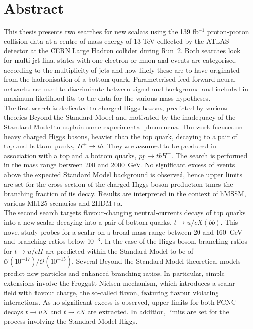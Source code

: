 \chapter*{Abstract}

This thesis presents two searches for new scalars using the 139 fb$^{-1}$ proton-proton collision data at a centre-of-mass energy of 13 TeV collected by the ATLAS detector at the CERN Large Hadron collider during Run~2. Both searches look for multi-jet final states with one electron or muon and events are categorised according to the multiplicity of jets and how likely these are to have originated from the hadronisation of a bottom quark. Parameterised feed-forward neural networks are used to discriminate between signal and background and included in maximum-likelihood fits to the data for the various mass hypotheses.\\

The first search is dedicated to charged Higgs bosons, predicted by various theories Beyond the Standard Model and motivated by the inadequacy of the Standard Model to explain some experimental phenomena. The work focuses on heavy charged Higgs bosons, heavier than the top quark, decaying to a pair of top and bottom quarks, $H^\pm\to tb$. They are assumed to be produced in association with a top and a bottom quarks, $pp\to tbH^\pm$. The search is performed in the mass range between 200 and 2000~GeV. No significant excess of events above the expected Standard Model background is observed, hence upper limits are set for the cross-section of the charged Higgs boson production times the branching fraction of its decay. Results are interpreted in the context of hMSSM, various Mh125 scenarios and 2HDM+a.\\

The second search targets flavour-changing neutral-currents decays of top quarks into a new scalar decaying into a pair of bottom quarks, $t \to u/c X(bb)$. This novel study probes for a scalar on a broad mass range between 20 and 160~GeV and branching ratios below 10$^{-3}$. In the case of the Higgs boson, branching ratios for $t \to u/c H$ are predicted within the Standard Model to be of $\mathcal{O}(10^{-17})/\mathcal{O}(10^{-15})$. Several Beyond the Standard Model theoretical models predict new particles and enhanced branching ratios. In particular, simple extensions involve the Froggatt-Nielsen mechanism, which introduces a scalar field with flavour charge, the so-called flavon, featuring flavour violating interactions. As no significant excess is observed, upper limits for both FCNC decays $t\to uX$ and $t\to cX$ are extracted. In addition, limits are set for the process involving the Standard Model Higgs.